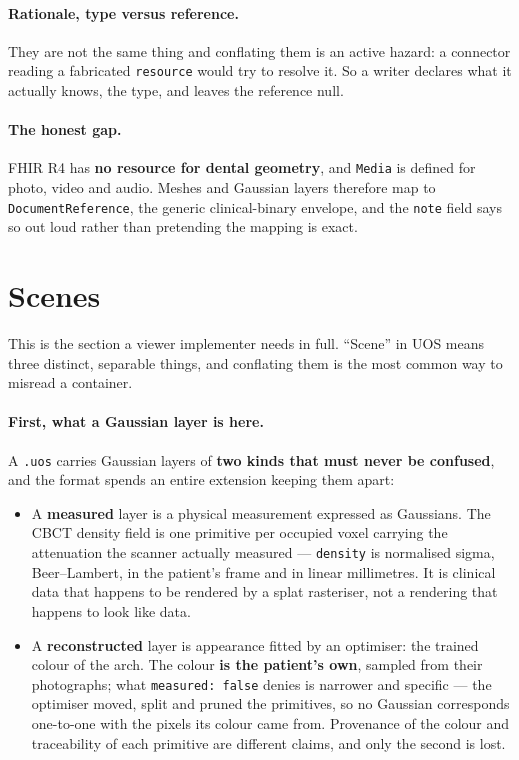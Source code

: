 \documentclass[11pt,a4paper]{article}
\newcommand{\code}[1]{\texttt{\small #1}}
\begin{document}
\paragraph{Rationale, type versus reference.} They are not the same thing and conflating
them is an active hazard: a connector reading a fabricated \code{resource} would try to
resolve it. So a writer declares what it actually knows, the type, and leaves the
reference null.

\paragraph{The honest gap.} FHIR R4 has \textbf{no resource for dental geometry}, and
\code{Media} is defined for photo, video and audio. Meshes and Gaussian layers therefore
map to \code{DocumentReference}, the generic clinical-binary envelope, and the \code{note}
field says so out loud rather than pretending the mapping is exact.

\section{Scenes}\label{sec:scenes}

This is the section a viewer implementer needs in full. ``Scene'' in UOS means three
distinct, separable things, and conflating them is the most common way to misread a
container.

\paragraph{First, what a Gaussian layer is here.} A \code{.uos} carries Gaussian layers of
\textbf{two kinds that must never be confused}, and the format spends an entire extension
keeping them apart:

\begin{itemize}
  \item A \textbf{measured} layer is a physical measurement expressed as Gaussians. The
  CBCT density field is one primitive per occupied voxel carrying the attenuation the
  scanner actually measured --- \code{density} is normalised sigma, Beer--Lambert, in the
  patient's frame and in linear millimetres. It is clinical data that happens to be
  rendered by a splat rasteriser, not a rendering that happens to look like data.
  \item A \textbf{reconstructed} layer is appearance fitted by an optimiser: the trained
  colour of the arch. The colour \textbf{is the patient's own}, sampled from their
  photographs; what \code{measured: false} denies is narrower and specific --- the
  optimiser moved, split and pruned the primitives, so no Gaussian corresponds one-to-one
  with the pixels its colour came from. Provenance of the colour and traceability of each
  primitive are different claims, and only the second is lost.
\end{itemize}
\end{document}
